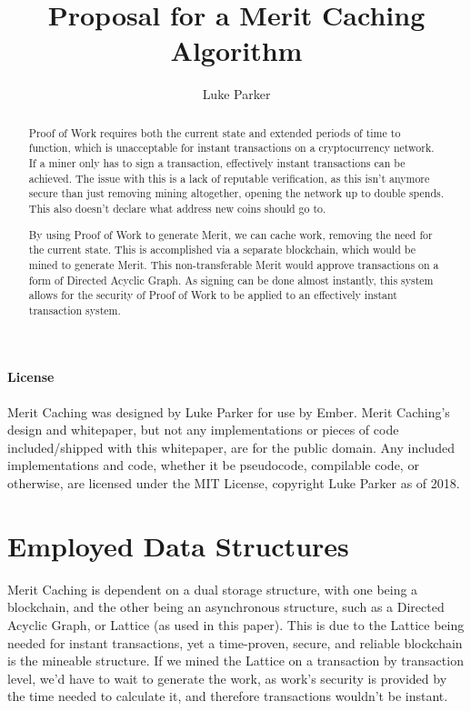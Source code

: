 \documentclass[14pt]{article}
\title{Proposal for a Merit Caching Algorithm}
\author{Luke Parker}
\begin{document}
\maketitle

\begin{abstract}
Proof of Work requires both the current state and extended periods of time to function, which is unacceptable for instant transactions on a cryptocurrency network. If a miner only has to sign a transaction, effectively instant transactions can be achieved. The issue with this is a lack of reputable verification, as this isn't anymore secure than just removing mining altogether, opening the network up to double spends. This also doesn't declare what address new coins should go to.

By using Proof of Work to generate Merit, we can cache work, removing the need for the current state. This is accomplished via a separate blockchain, which would be mined to generate Merit. This non-transferable Merit would approve transactions on a form of Directed Acyclic Graph. As signing can be done almost instantly, this system allows for the security of Proof of Work to be applied to an effectively instant transaction system.
\end{abstract}

\paragraph{License}
Merit Caching was designed by Luke Parker for use by Ember. Merit Caching's design and whitepaper, but not any implementations or pieces of code included/shipped with this whitepaper, are for the public domain. Any included implementations and code, whether it be pseudocode, compilable code, or otherwise, are licensed under the MIT License, copyright Luke Parker as of 2018.

\newpage

\setcounter{tocdepth}{3}
\tableofcontents

\newpage

\section{Employed Data Structures}
Merit Caching is dependent on a dual storage structure, with one being a blockchain, and the other being an asynchronous structure, such as a Directed Acyclic Graph, or Lattice (as used in this paper). This is due to the Lattice being needed for instant transactions, yet a time-proven, secure, and reliable blockchain is the mineable structure. If we mined the Lattice on a transaction by transaction level, we'd have to wait to generate the work, as work's security is provided by the time needed to calculate it, and therefore transactions wouldn't be instant.
\end{document}
